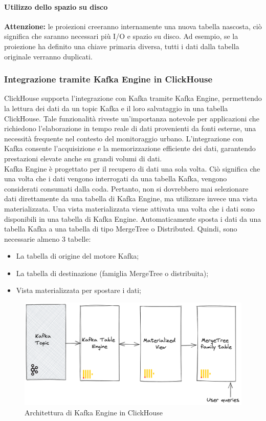 \paragraph*{Utilizzo dello spazio su disco}
\textbf{Attenzione:} le proiezioni creeranno internamente una nuova tabella nascosta, ciò significa che saranno necessari più I/O e spazio su disco. Ad esempio, se la proiezione ha definito una chiave primaria diversa, tutti i dati dalla tabella originale verranno duplicati.

\subsubsection{Integrazione tramite Kafka Engine in ClickHouse}\label{sec:kafka_engine}
ClickHouse supporta l'integrazione con Kafka tramite Kafka Engine, permettendo la lettura dei dati da un topic Kafka e il loro salvataggio in una tabella ClickHouse. Tale funzionalità riveste un'importanza notevole per applicazioni che richiedono l'elaborazione in tempo reale di dati provenienti da fonti esterne, una necessità frequente nel contesto del monitoraggio urbano. L'integrazione con Kafka consente l'acquisizione e la memorizzazione efficiente dei dati, garantendo prestazioni elevate anche su grandi volumi di dati.\\
Kafka Engine è progettato per il recupero di dati una sola volta. Ciò significa che una volta che i dati vengono interrogati da una tabella Kafka, vengono considerati consumati dalla coda. Pertanto, non si dovrebbero mai selezionare dati direttamente da una tabella di Kafka Engine, ma utilizzare invece una vista materializzata. Una vista materializzata viene attivata una volta che i dati sono disponibili in una tabella di Kafka Engine. Automaticamente sposta i dati da una tabella Kafka a una tabella di tipo MergeTree o Distributed. Quindi, sono necessarie almeno 3 tabelle:
\begin{itemize}
  \item La tabella di origine del motore Kafka;
  \item La tabella di destinazione (famiglia MergeTree o distribuita);
  \item Vista materializzata per spostare i dati;
\end{itemize}
\begin{figure}[H]
  \centering
  \includegraphics[width=.7\textwidth]{../Images/SpecificaTecnica/kafka_engine_architecture.png}
  \caption{Architettura di Kafka Engine in ClickHouse}
  \label{fig:Architettura_kafka_engine}
\end{figure}

